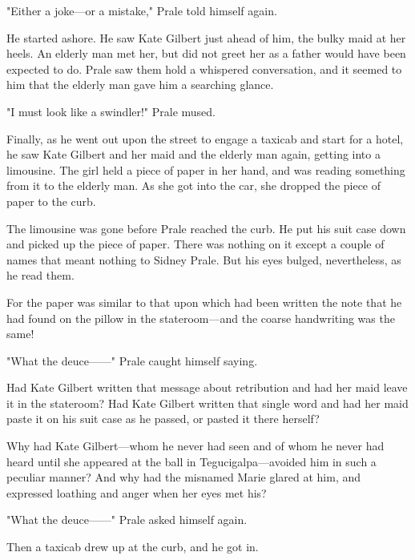 \documentclass{novel}
\begin{document}
"Either a joke---or a mistake," Prale told himself again.

He started ashore. He saw Kate Gilbert just ahead of him, the bulky maid at her heels. An elderly man met her, but did not greet her as a father would have been expected to do. Prale saw them hold a whispered conversation, and it seemed to him that the elderly man gave him a searching glance.

"I must look like a swindler!" Prale mused.

Finally, as he went out upon the street to engage a taxicab and start for a hotel, he saw Kate Gilbert and her maid and the elderly man again, getting into a limousine. The girl held a piece of paper in her hand, and was reading something from it to the elderly man. As she got into the car, she dropped the piece of paper to the curb.

The limousine was gone before Prale reached the curb. He put his suit case down and picked up the piece of paper. There was nothing on it except a couple of names that meant nothing to Sidney Prale. But his eyes bulged, nevertheless, as he read them.

For the paper was similar to that upon which had been written the note that he had found on the pillow in the stateroom---and the coarse handwriting was the same!

"What the deuce------" Prale caught himself saying.

Had Kate Gilbert written that message about retribution and had her maid leave it in the stateroom? Had Kate Gilbert written that single word and had her maid paste it on his suit case as he passed, or pasted it there herself?

Why had Kate Gilbert---whom he never had seen and of whom he never had heard until she appeared at the ball in Tegucigalpa---avoided him in such a peculiar manner? And why had the misnamed Marie glared at him, and expressed loathing and anger when her eyes met his?

"What the deuce------" Prale asked himself again.

Then a taxicab drew up at the curb, and he got in.

\vspace{2\nbs}
\clearpage
\thispagestyle{empty}

\begin{ChapterStart}
\vspace{3\nbs}
\end{ChapterStart}
    
\end{document}
